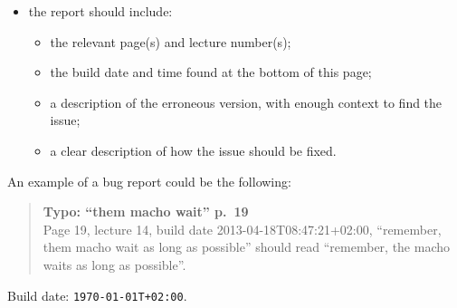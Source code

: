 \documentclass[10pt, a4paper, twoside]{lecturenotes}
\begin{document}
\begin{itemize}
\item the report should include:
\begin{itemize}
\item the relevant page(s) and lecture number(s);
\item the build date and time found at the bottom of this page;
\item a description of the erroneous version, with enough context to find the issue;
\item a clear description of how the issue should be fixed.
\end{itemize}
\end{itemize}
An example of a bug report could be the following:
\begin{quote}
\textsf{%
\textbf{Typo: ``them macho wait'' p.~19}\\
Page 19, lecture 14, build date 2013-04-18T08:47:21+02:00, ``remember, them macho wait as long as possible'' should read ``remember, the macho waits as long as possible''.
}
\end{quote}
\vfill
Build date: \texttt{\today T\currenttime+02:00}.
\end{document}
